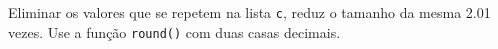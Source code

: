 \documentclass[12pt,varwidth=16cm,border=1pt]{standalone}
\begin{document}
Eliminar os valores que se repetem na lista \verb+c+, reduz o tamanho da mesma 2.01 vezes. Use a função \verb+round()+ com duas casas decimais.

\questiomtrue
\end{document}
